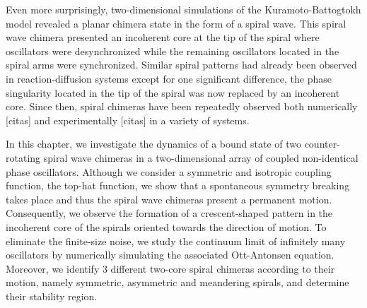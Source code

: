 Even more surprisingly, two-dimensional simulations of the Kuramoto-Battogtokh model
revealed a planar chimera state in the form of a spiral wave. This spiral wave chimera
presented an incoherent core at the tip of the spiral where oscillators were desynchronized
while the remaining oscillators located in the spiral arms were synchronized. Similar spiral
patterns had already been observed in reaction-diffusion systems except for one significant
difference, the phase singularity located in the tip of the spiral was now replaced by
an incoherent core. Since then, spiral chimeras have been repeatedly observed both numerically [citas] and experimentally [citas]
in a variety of systems. 

In this chapter, we investigate the dynamics of a bound state of two counter-rotating spiral wave chimeras in a two-dimensional array of coupled non-identical
phase oscillators. Although we consider a symmetric and isotropic coupling function,
the top-hat function, we show that a spontaneous symmetry breaking takes place
and thus the spiral wave chimeras present a permanent motion. Consequently,
we observe the formation of a crescent-shaped pattern in the incoherent core
of the spirals oriented towards the direction of motion. To eliminate the
finite-size noise, we study the
continuum limit of infinitely many oscillators by numerically simulating the
associated Ott-Antonsen equation. Moreover, we identify 3 different two-core spiral chimeras according to their motion, namely symmetric, asymmetric
and meandering spirals, and determine their stability region.


 




